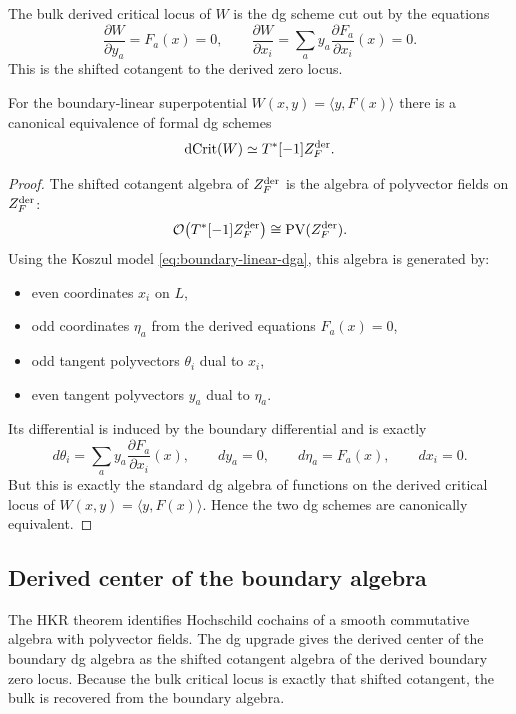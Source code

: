 The bulk derived critical locus of $W$ is the dg scheme cut out by the equations
\[
\frac{\partial W}{\partial y_a}=F_a(x)=0,
\qquad
\frac{\partial W}{\partial x_i}
=
\sum_a y_a\frac{\partial F_a}{\partial x_i}(x)=0.
\]
This is the shifted cotangent to the derived zero locus.

\begin{theorem}%
For the boundary-linear superpotential $W(x,y)=\langle y,F(x)\rangle$ there is a canonical equivalence of formal dg schemes
\[
\operatorname{dCrit}(W)\simeq T^*[-1] Z_F^{\mathrm{der}}.
\]
\end{theorem}

\begin{proof}
The shifted cotangent algebra of $Z_F^{\mathrm{der}}$ is the algebra of polyvector fields on $Z_F^{\mathrm{der}}$:
\[
\mathcal O\bigl(T^*[-1]Z_F^{\mathrm{der}}\bigr)\cong \operatorname{PV}(Z_F^{\mathrm{der}}).
\]
Using the Koszul model \eqref{eq:boundary-linear-dga}, this algebra is generated by:
\begin{itemize}[leftmargin=1.8em]
\item even coordinates $x_i$ on $L$,
\item odd coordinates $\eta_a$ from the derived equations $F_a(x)=0$,
\item odd tangent polyvectors $\theta_i$ dual to $x_i$,
\item even tangent polyvectors $y_a$ dual to $\eta_a$.
\end{itemize}
Its differential is induced by the boundary differential and is exactly
\[
d\theta_i
=
\sum_a y_a\frac{\partial F_a}{\partial x_i}(x),
\qquad
dy_a=0,
\qquad
d\eta_a=F_a(x),
\qquad
dx_i=0.
\]
But this is exactly the standard dg algebra of functions on the derived critical locus of $W(x,y)=\langle y,F(x)\rangle$. Hence the two dg schemes are canonically equivalent.
\end{proof}

\subsection{Derived center of the boundary algebra}

The HKR theorem identifies Hochschild cochains of a smooth commutative algebra with polyvector fields. The dg upgrade gives the derived center of the boundary dg algebra as the shifted cotangent algebra of the derived boundary zero locus. Because the bulk critical locus is exactly that shifted cotangent, the bulk is recovered from the boundary algebra.

